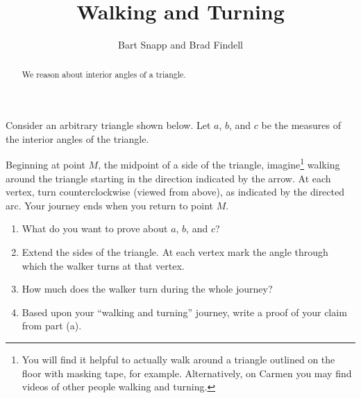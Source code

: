 \documentclass[nooutcomes,noauthor]{ximera}
\title{Walking and Turning}
\author{Bart Snapp and Brad Findell}
\begin{document}
\begin{abstract}
  We reason about interior angles of a triangle.
\end{abstract}
\maketitle


\begin{problem}
Consider an arbitrary triangle shown below.  Let $a$, $b$, and $c$ be the measures of the interior angles of the triangle.  

Beginning at point $M$, the midpoint of a side of the triangle, imagine\footnote{You will find it helpful to actually walk around a triangle outlined on the floor with masking tape, for example.  Alternatively, on Carmen you may find videos of other people walking and turning.} walking around the triangle starting in the direction indicated by the arrow.  At each vertex, turn counterclockwise (viewed from above), as indicated by the directed arc.  Your journey ends when you return to point $M$.  
\begin{enumerate}
\item What do you want to prove about $a$, $b$, and $c$?  
\item Extend the sides of the triangle.  At each vertex mark the angle through which the walker turns at that vertex.  
\item How much does the walker turn during the whole journey?  
\item Based upon your ``walking and turning'' journey, write a proof of your claim from part (a).  
\begin{image}
\end{image}
\vfill
\end{enumerate}
\end{problem}
\end{document}

